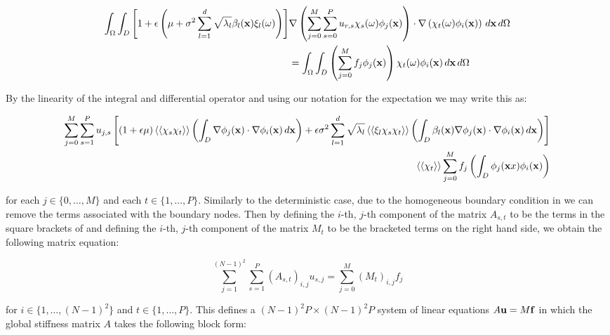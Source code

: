\begin{align}
  \begin{split}
    \int_\Omega\int_D
    \left[1 + \epsilon\left(\mu +
  \sigma^2\sum_{l=1}^d\sqrt{\lambda_l}\beta_l(\mathbf{x})\xi_l(\omega)\right)\right]
      &\nabla\left(\sum_{j=0}^M\sum_{s=0}^Pu_{r,s}\chi_s(\omega)\phi_j(\mathbf{x})\right)
      \cdot\nabla\left(\chi_t(\omega)\phi_i(\mathbf{x})\right)\, d\mathbf{x}\, d\Omega \\
      &= \int_\Omega\int_D\left(\sum_{j=0}^Mf_j\phi_j(\mathbf{x})\right)
        \chi_t(\omega)\phi_i(\mathbf{x})\, d\mathbf{x}\, d\Omega
  \end{split}
\end{align}

By the linearity of the integral and differential operator and using our
notation for the expectation  we may
write this as:

\begin{align}\label{eq:twod-stochastic-discrete}
  \begin{split}
      \sum_{j=0}^M\sum_{s=1}^Pu_{j,s}\left[(1 + \epsilon\mu)\left\langle\langle\chi_s\chi_t\right\rangle\rangle
      \left(\int_D\nabla\phi_j(\mathbf{x})\cdot\nabla\phi_i(\mathbf{x})\, d\mathbf{x}\right) +
      \epsilon\sigma^2\sum_{l=1}^d\sqrt{\lambda_l}\left\langle\langle\xi_l\chi_s\chi_t\right\rangle\rangle
      \left(\int_D\beta_l(\mathbf{x})\nabla\phi_j(\mathbf{x})\cdot\nabla\phi_i(\mathbf{x})\, d\mathbf{x}\right)\right] \\
      \left\langle\langle\chi_t\right\rangle\rangle\sum_{j=0}^Mf_j\left(\int_D\phi_j(\mathbf{x}x)\phi_i(\mathbf{x})\right)
  \end{split}
\end{align}

for each $j \in \{0,\ldots,M\}$ and each $t \in \{1, \ldots, P\}$. Similarly to
the deterministic case, due to the homogeneous boundary condition in
 we can remove the terms associated with the boundary
nodes. Then by defining the $i$-th, $j$-th component of the matrix $A_{s,t}$ to
be the terms in the square brackets of  and
defining the $i$-th, $j$-th component of the matrix $M_t$ to be the bracketed
terms on the right hand side, we obtain the following matrix equation:

\begin{equation}
    \sum_{j=1}^{(N-1)^2}\sum_{s=1}^P(A_{s,t})_{i,j}u_{s,j} =
    \sum_{j=0}^M(M_t)_{i,j}f_j
\end{equation}

for $i \in \{1, \ldots, (N-1)^2\}$ and $t \in \{1,\ldots,P\}$. This defines a
$(N-1)^2P \times (N-1)^2P$ system of linear equations $A\mathbf{u} = M\mathbf{f}$ in
which the global stiffness matrix $A$ takes the following block form:

